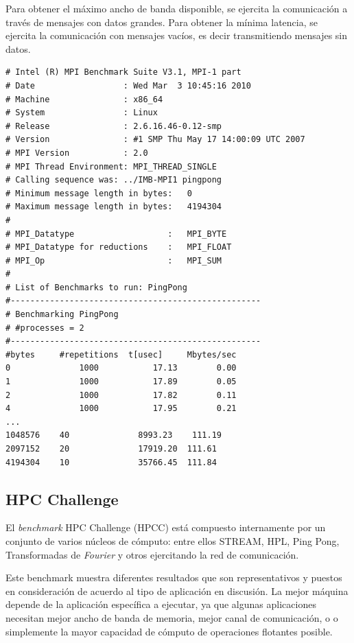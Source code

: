 \documentclass[a4paper]{report}
\begin{document}
\bigskip

Para obtener el m\'aximo ancho de banda disponible, se ejercita la comunicaci\'on a trav\'es de mensajes con datos grandes.
Para obtener la m\'inima latencia, se ejercita la comunicaci\'on con mensajes vac\'ios, es decir transmitiendo mensajes sin datos.

{\small
\begin{verbatim}
# Intel (R) MPI Benchmark Suite V3.1, MPI-1 part
# Date                  : Wed Mar  3 10:45:16 2010
# Machine               : x86_64
# System                : Linux
# Release               : 2.6.16.46-0.12-smp
# Version               : #1 SMP Thu May 17 14:00:09 UTC 2007
# MPI Version           : 2.0
# MPI Thread Environment: MPI_THREAD_SINGLE
# Calling sequence was: ../IMB-MPI1 pingpong
# Minimum message length in bytes:   0
# Maximum message length in bytes:   4194304
#
# MPI_Datatype                   :   MPI_BYTE
# MPI_Datatype for reductions    :   MPI_FLOAT
# MPI_Op                         :   MPI_SUM
#
# List of Benchmarks to run: PingPong
#---------------------------------------------------
# Benchmarking PingPong
# #processes = 2
#---------------------------------------------------
#bytes     #repetitions  t[usec]     Mbytes/sec
0              1000           17.13        0.00
1              1000           17.89        0.05
2              1000           17.82        0.11
4              1000           17.95        0.21
...
1048576    40              8993.23    111.19
2097152    20              17919.20  111.61
4194304    10              35766.45  111.84
\end{verbatim}
}

\subsection{HPC Challenge}

El {\it benchmark} HPC Challenge \cite{hpcc} (HPCC) est\'a compuesto internamente por un conjunto de
varios n\'ucleos de c\'omputo: entre ellos STREAM, HPL, Ping Pong, Transformadas de {\it Fourier}
y otros ejercitando la red de comunicaci\'on.

\bigskip

Este benchmark muestra diferentes resultados que son representativos
y puestos en consideraci\'on de acuerdo al tipo de aplicaci\'on en discusi\'on.
La mejor m\'aquina depende de la aplicaci\'on espec\'ifica a ejecutar, ya que algunas
aplicaciones necesitan mejor ancho de banda de memoria, mejor canal de comunicaci\'on, o
o simplemente la mayor capacidad de c\'omputo de operaciones flotantes posible.
\end{document}

